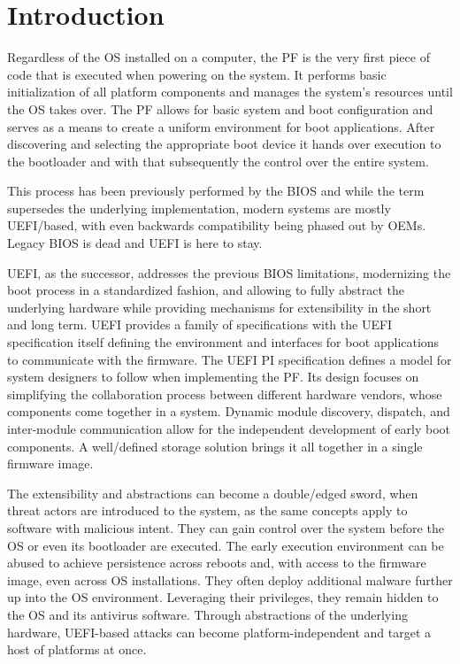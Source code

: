 

\chapter{Introduction}
\label{sec:introduction}

Regardless of the \ac{OS} installed on a computer, the \ac{PF} is the very first piece of code that is executed when powering on the system.
It performs basic initialization of all platform components and manages the system's resources until the \ac{OS} takes over.
The \ac{PF} allows for basic system and boot configuration and serves as a means to create a uniform environment for boot applications.
After discovering and selecting the appropriate boot device it hands over execution to the bootloader and with that subsequently the control over the entire system.

This process has been previously performed by the \ac{BIOS} and while the term supersedes the underlying implementation, modern systems are mostly \ac{UEFI}\-/based, with even backwards compatibility being phased out by \acp{OEM}.
Legacy \ac{BIOS} is dead and \ac{UEFI} is here to stay.

\ac{UEFI}, as the successor, addresses the previous \ac{BIOS} limitations, modernizing the boot process in a standardized fashion, and allowing to fully abstract the underlying hardware while providing mechanisms for extensibility in the short and long term.
\ac{UEFI} provides a family of specifications with the \ac{UEFI} specification itself defining the environment and interfaces for boot applications to communicate with the firmware.
The \ac{UEFI} \ac{PI} specification defines a model for system designers to follow when implementing the \ac{PF}.
Its design focuses on simplifying the collaboration process between different hardware vendors, whose components come together in a system.
Dynamic module discovery, dispatch, and inter-module communication allow for the independent development of early boot components.
A well\-/defined storage solution brings it all together in a single firmware image.

The extensibility and abstractions can become a double\-/edged sword, when threat actors are introduced to the system, as the same concepts apply to software with malicious intent.
They can gain control over the system before the \ac{OS} or even its bootloader are executed.
The early execution environment can be abused to achieve persistence across reboots and, with access to the firmware image, even across \ac{OS} installations.
They often deploy additional malware further up into the \ac{OS} environment.
Leveraging their privileges, they remain hidden to the \ac{OS} and its antivirus software.
Through abstractions of the underlying hardware, \ac{UEFI}-based attacks can become platform-independent and target a host of platforms at once.

